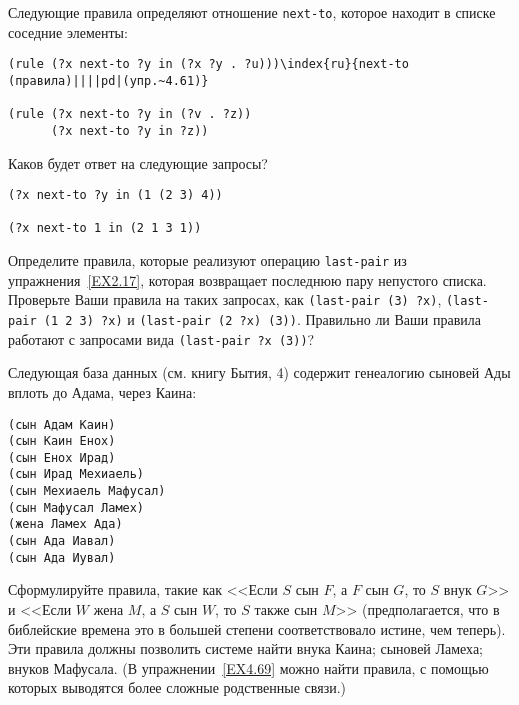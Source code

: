\begin{exercise}{4.61}%
\label{EX4.61}%
Следующие правила определяют отношение
{\tt next-to}, которое находит в списке соседние элементы:

\begin{Verbatim}[fontsize=\small]
(rule (?x next-to ?y in (?x ?y . ?u)))\index{ru}{next-to (правила)||||pd|(упр.~4.61)}

(rule (?x next-to ?y in (?v . ?z))
      (?x next-to ?y in ?z))
\end{Verbatim}
Каков будет ответ на следующие запросы?

\begin{Verbatim}[fontsize=\small]
(?x next-to ?y in (1 (2 3) 4))

(?x next-to 1 in (2 1 3 1))
\end{Verbatim}
\end{exercise}

\begin{exercise}{4.62}%
\label{EX4.62}%
Определите правила, которые реализуют операцию
{\tt last-pair}
из упражнения~\ref{EX2.17}, которая
возвращает последнюю пару непустого списка.  Проверьте Ваши правила на
таких запросах, как {\tt (last-pair (3) ?x)}, {\tt (last-pair
(1 2 3) ?x)} и {\tt (last-pair (2 ?x) (3))}.  Правильно
ли Ваши правила работают с запросами вида {\tt (last-pair ?x
(3))}?
\end{exercise}

\begin{exercise}{4.63}%
\label{EX4.63}%
Следующая база данных (см. книгу
Бытия, 4) содержит генеалогию сыновей  Ады вплоть до Адама, через Каина:

\begin{Verbatim}[fontsize=\small]
(сын Адам Каин)
(сын Каин Енох)
(сын Енох Ирад)
(сын Ирад Мехиаель)
(сын Мехиаель Мафусал)
(сын Мафусал Ламех)
(жена Ламех Ада)
(сын Ада Иавал)
(сын Ада Иувал)
\end{Verbatim}
Сформулируйте правила, такие как <<Если $S$ сын $F$, а
$F$ сын $G$, то $S$ внук
$G$>> и <<Если $W$ жена $M$, а
$S$ сын $W$, то $S$ также сын
$M$>> (предполагается, что в библейские времена это в
большей степени соответствовало истине, чем теперь).  Эти правила
должны позволить системе найти внука Каина; сыновей Ламеха; внуков
Мафусала. (В упражнении~\ref{EX4.69} можно найти правила,
с помощью которых выводятся более сложные родственные связи.)
\end{exercise}

